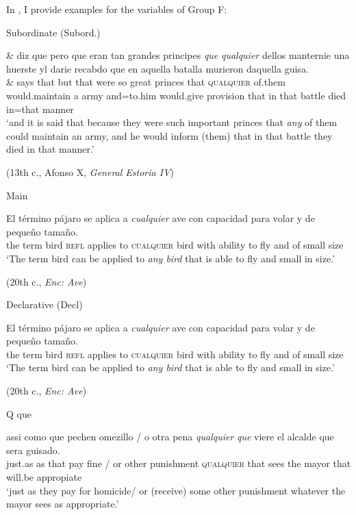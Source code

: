 In , I provide examples for the variables of Group F:

\ea \label{ex:key:278}
\ea \label{ex:key:278-1} Subordinate (Subord.)
    
    \gll \& diz que pero que eran tan grandes principes \textit{que} \textit{qualquier} dellos manternie una huerste yl darie recabdo que en aquella batalla murieron daquella guisa.\\
\& says that but that were so great princes that \textsc{qualquier} of.them would.maintain a army and=to.him would.give provision that in that battle died in=that manner\\
    \glt ‘and it is said that because they were such important princes that \textit{any} of them could maintain an army, and he would inform (them) that in that battle they died in that manner.’

    (13th c., Afonso X, \textit{General Estoria IV})
    
\ex \label{ex:key:278-2} Main
    
    \gll El término pájaro se aplica a \textit{cualquier} ave con capacidad para volar y de pequeño tamaño.\\
the term bird \textsc{refl} applies to \textsc{cualquier} bird with ability to fly and of small size\\
    \glt ‘The term bird can be applied to \textit{any bird} that is able to fly and small in size.’

    (20th c., \textit{Enc: Ave})
    
\ex \label{ex:key:278-3} Declarative (Decl)

    \gll El término pájaro se aplica a \textit{cualquier} ave con capacidad para volar y de pequeño tamaño.\\
    the term bird \textsc{refl} applies to \textsc{cualquier} bird with ability to fly and of small size\\
    \glt  ‘The term bird can be applied to \textit{any bird} that is able to fly and small in size.’

    (20th c., \textit{Enc: Ave})
    
\ex \label{ex:key:278-4} Q que

    \gll assi como que pechen omezillo / o otra pena \textit{qualquier} \textit{que} viere el alcalde que sera guisado.\\
    just.as as that pay fine / or other punishment \textsc{qualquier} that sees the mayor that will.be appropiate\\
    \glt ‘just as they pay for homicide/ or (receive) some other punishment whatever the mayor sees as appropriate.’

